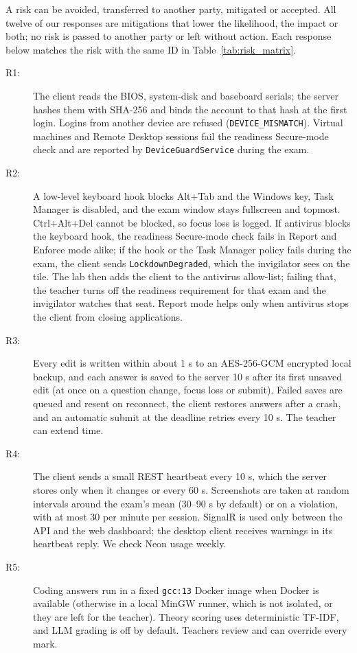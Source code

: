 A risk can be avoided, transferred to another party, mitigated or accepted. All twelve of our responses are mitigations that lower the likelihood, the impact or both; no risk is passed to another party or left without action. Each response below matches the risk with the same ID in Table~\ref{tab:risk_matrix}.

\begin{description}
    \item[R1:] The client reads the BIOS, system-disk and baseboard serials; the server hashes them with SHA-256 and binds the account to that hash at the first login. Logins from another device are refused (\texttt{DEVICE\_MISMATCH}). Virtual machines and Remote Desktop sessions fail the readiness Secure-mode check and are reported by \texttt{DeviceGuardService} during the exam.
    \item[R2:] A low-level keyboard hook blocks Alt+Tab and the Windows key, Task Manager is disabled, and the exam window stays fullscreen and topmost. Ctrl+Alt+Del cannot be blocked, so focus loss is logged. If antivirus blocks the keyboard hook, the readiness Secure-mode check fails in Report and Enforce mode alike; if the hook or the Task Manager policy fails during the exam, the client sends \texttt{LockdownDegraded}, which the invigilator sees on the tile. The lab then adds the client to the antivirus allow-list; failing that, the teacher turns off the readiness requirement for that exam and the invigilator watches that seat. Report mode helps only when antivirus stops the client from closing applications.
    \item[R3:] Every edit is written within about 1 s to an AES-256-GCM encrypted local backup, and each answer is saved to the server 10 s after its first unsaved edit (at once on a question change, focus loss or submit). Failed saves are queued and resent on reconnect, the client restores answers after a crash, and an automatic submit at the deadline retries every 10 s. The teacher can extend time.
    \item[R4:] The client sends a small REST heartbeat every 10 s, which the server stores only when it changes or every 60 s. Screenshots are taken at random intervals around the exam's mean (30--90 s by default) or on a violation, with at most 30 per minute per session. SignalR is used only between the API and the web dashboard; the desktop client receives warnings in its heartbeat reply. We check Neon usage weekly.
    \item[R5:] Coding answers run in a fixed \texttt{gcc:13} Docker image when Docker is available (otherwise in a local MinGW runner, which is not isolated, or they are left for the teacher). Theory scoring uses deterministic TF-IDF, and LLM grading is off by default. Teachers review and can override every mark.

\end{description}
